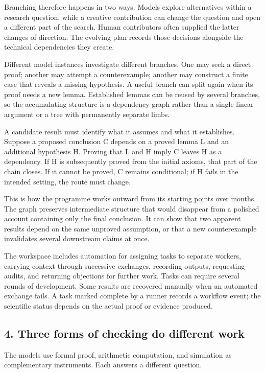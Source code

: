 \documentclass[
  11pt,
]{article}
\begin{document}
Branching therefore happens in two ways. Models explore alternatives
within a research question, while a creative contribution can change the
question and open a different part of the search. Human contributors
often supplied the latter changes of direction. The evolving plan
records those decisions alongside the technical dependencies they
create.

Different model instances investigate different branches. One may seek a
direct proof; another may attempt a counterexample; another may
construct a finite case that reveals a missing hypothesis. A useful
branch can split again when its proof needs a new lemma. Established
lemmas can be reused by several branches, so the
accumulating structure is a dependency graph rather than a single linear
argument or a tree with permanently separate limbs.

A candidate result must identify what it assumes and what it
establishes. Suppose a proposed conclusion C depends on a proved lemma L
and an additional hypothesis H. Proving that L and H imply C leaves H as
a dependency. If H is subsequently proved from the initial axioms, that
part of the chain closes. If it cannot be proved, C remains conditional;
if H fails in the intended setting, the route must change.

This is how the programme works outward from its starting points over
months. The graph preserves intermediate structure that would disappear
from a polished account containing only the final conclusion. It can
show that two apparent results depend on the same unproved assumption,
or that a new counterexample invalidates several downstream claims at
once.

The workspace includes automation for assigning tasks to separate
workers, carrying context through successive exchanges, recording
outputs, requesting audits, and returning objections for further work.
Tasks can require several rounds of development. Some results are
recovered manually when an automated exchange fails. A task marked
complete by a runner records a workflow event; the scientific status
depends on the actual proof or evidence produced.

\subsection{4. Three forms of checking do different
work}\label{three-forms-of-checking-do-different-work}

The models use formal proof, arithmetic computation, and simulation as
complementary instruments. Each answers a different question.
\end{document}
